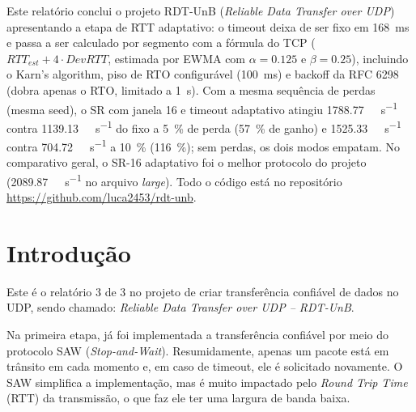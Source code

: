 \documentclass[11pt,a4paper]{article}
\begin{document}
\capa

\begin{resumo}
Este relatório conclui o projeto RDT-UnB (\textit{Reliable Data Transfer over
UDP}) apresentando a etapa de RTT adaptativo: o timeout deixa de ser fixo em
\SI{168}{\milli\second} e passa a ser calculado por segmento com a fórmula do
TCP ($RTT_{est} + 4 \cdot DevRTT$, estimada por EWMA com $\alpha = 0.125$ e
$\beta = 0.25$), incluindo o Karn's algorithm, piso de RTO configurável
(\SI{100}{\milli\second}) e backoff da RFC 6298 (dobra apenas o RTO, limitado a
\SI{1}{\second}). Com a mesma sequência de perdas (mesma seed), o SR com janela
16 e timeout adaptativo atingiu \SI{1788.77}{\kilo\bit\per\second} contra
\SI{1139.13}{\kilo\bit\per\second} do fixo a \SI{5}{\percent} de perda
(\SI{57}{\percent} de ganho) e \SI{1525.33}{\kilo\bit\per\second} contra
\SI{704.72}{\kilo\bit\per\second} a \SI{10}{\percent} (\SI{116}{\percent}); sem
perdas, os dois modos empatam. No comparativo geral, o SR-16 adaptativo foi o
melhor protocolo do projeto (\SI{2089.87}{\kilo\bit\per\second} no arquivo
\textit{large}). Todo o código está no
repositório \url{https://github.com/luca2453/rdt-unb}.
\end{resumo}

%
%


\section{Introdução}


Este é o relatório 3 de 3 no projeto de criar transferência confiável de dados
no UDP, sendo chamado: \textit{Reliable Data Transfer over UDP – RDT-UnB}.

Na primeira etapa, já foi implementada a transferência confiável por meio do protocolo
SAW (\textit{Stop-and-Wait}). Resumidamente, apenas um pacote está em trânsito em
cada momento e, em caso de timeout, ele é solicitado novamente. O SAW simplifica 
a implementação, mas é muito impactado pelo \textit{Round Trip Time} (RTT) da
transmissão, o que faz ele ter uma largura de banda baixa.
\end{document}
